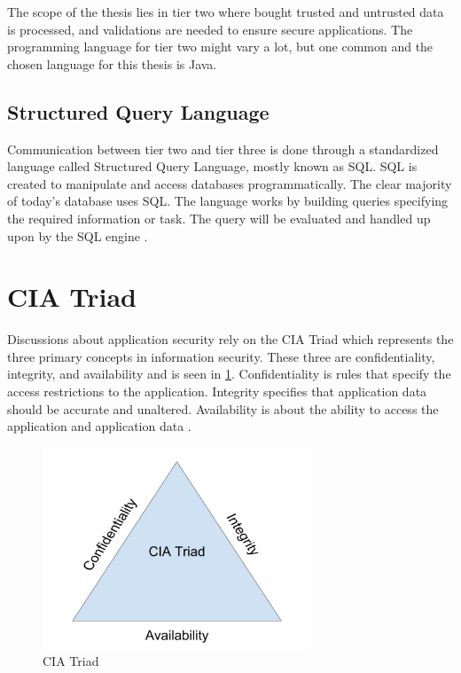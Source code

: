 The scope of the thesis lies in tier two where bought trusted and untrusted data is processed, and validations are needed to ensure secure applications. The programming language for tier two might vary a lot, but one common and the chosen language for this thesis is Java.



\subsection{Structured Query Language}
Communication between tier two and tier three is done through a standardized language called Structured Query Language, mostly known as SQL. SQL is created to manipulate and access databases programmatically. The clear majority of today's database uses SQL. The language works by building queries specifying the required information or task. The query will be evaluated and handled up upon by the SQL engine \parencite{DarieCristian2003TPGt}.



\section{CIA Triad}
\label{cia}
Discussions about application security rely on the CIA Triad which represents the three primary concepts in information security. These three are confidentiality, integrity, and availability and is seen in \ref{fig:CIATriad}. Confidentiality is rules that specify the access restrictions to the application. Integrity specifies that application data should be accurate and unaltered. Availability is about the ability to access the application and application data \parencite{2014C1-W}.

\begin{figure}[H]
    \centering
    \includegraphics[height=6cm]{images/CIATriad.jpg}
    \caption{CIA Triad}
    \label{fig:CIATriad}
\end{figure}



